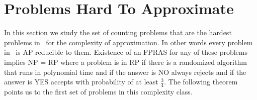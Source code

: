 \begin{comment}
Consider a Markov chain with each state representing a solution of the problem.
The transitions are to the same solution with probability of \(\frac{1}{2}\) 
and to a similar solution with probability \(\frac{1}{2}\).

There is usually a sequence of instances (the length of sequence is polynomial) such that
the first element of the sequence is the instance  that we are trying to solve
and the last element is a trivial instance.
The ratio of answers between two consecutive elements 
is estimated by sampling along a random walk.
The final answer is the product of the ratios and the answer for trivial instance. 

In order for Markov chain Monte-Carlo to work, the chain must be ergodic and rapidly mixing.
Mixing time is the minimum length of a random walk such that the required
quantity is measured with desired approximation and if mixing
time is polynomial then the chain is said to be rapidly mixing.

The problem \pname{\#Match} is solved as follows.
A suitable sequence \(\bl\) of real numbers beginning with one and ending
with zero is chosen. The ratios \(Z_G(\bl_i)/Z_G(\bl_{i+1})\) are estimated 
by sampling along a random walk on the Markov chain. \(Z_G(1)\) is the product of
all the ratios.

The \ldkcol\ problem is solved as follows. Let \mG\ be a graph with \mn\ vertices
and \mm\ edges. Let \(\bG\) be a sequence of subgraphs of \mG\ where
\(\bG_0=G\) and \(\bG_{i+1}\) is obtained from \(\bG_i\) by removing a single edge. 
The last element \(\bG_m\) is an empty graph which is k-colorable in \(k^n\) ways.
The ratio \(Z(G_i)/Z(G_{i+1})\) is estimated
by sampling along a random walk on the Markov chain. \(Z(G)\) is the product of all the
ratios and the number of k-colorings of \(\bG_m\).
\end{comment}

\section{Problems Hard To Approximate} \label{sec:hard}
In this section we study the set of counting problems that are the hardest problems in \cp\
for the complexity of approximation. In other words every
problem in \cp\ is AP-reducible to them.
Existence of an FPRAS for any of these problems implies NP = RP where 
a problem is in RP if there is a randomized algorithm that runs in polynomial time
and if the answer is NO always rejects and if the answer is YES accepts
with probability of at least \(\frac{3}{4}\). The following theorem 
points us to the first set of problems in this complexity class.

